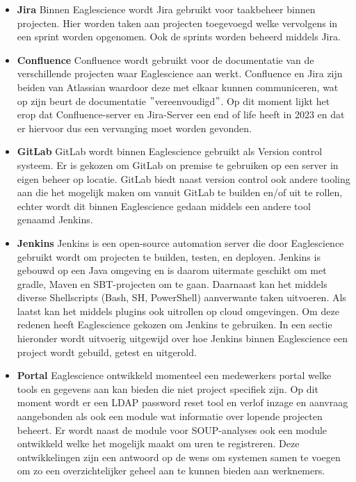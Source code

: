 \begin{itemize}
    \item \textbf{Jira}
    Binnen Eaglescience wordt Jira gebruikt voor taakbeheer binnen projecten. Hier worden taken aan projecten toegevoegd welke vervolgens in een sprint worden opgenomen. Ook de sprints worden beheerd middels Jira.
    \item \textbf{Confluence}
    Confluence wordt gebruikt voor de documentatie van de verschillende projecten waar Eaglescience aan werkt. Confluence en Jira zijn beiden van Atlassian waardoor deze met elkaar kunnen communiceren, wat op zijn beurt de documentatie $"$vereenvoudigd$"$. Op dit moment lijkt het erop dat Confluence-server en Jira-Server een end of life heeft in 2023 en dat er hiervoor dus een vervanging moet worden gevonden.
    \item \textbf{GitLab}
    GitLab wordt binnen Eaglescience gebruikt als Version control systeem. Er is gekozen om GitLab on premise te gebruiken op een server in eigen beheer op locatie. GitLab biedt naast version control ook andere tooling aan die het mogelijk maken om vanuit GitLab te builden en/of uit te rollen, echter wordt dit binnen Eaglescience gedaan middels een andere tool genaamd Jenkins.
    \item \textbf{Jenkins}
    Jenkins is een open-source automation server die door Eaglescience gebruikt wordt om projecten te builden, testen, en deployen. Jenkins is gebouwd op een Java omgeving en is daarom uitermate geschikt om met gradle, Maven en SBT-projecten om te gaan. Daarnaast kan het middels diverse Shellscripts (Bash, SH, PowerShell) aanverwante taken uitvoeren. Als laatst kan het middels plugins ook uitrollen op cloud omgevingen. Om deze redenen heeft Eaglescience gekozen om Jenkins te gebruiken. In een sectie hieronder wordt uitvoerig uitgewijd over hoe Jenkins binnen Eaglescience een project wordt gebuild, getest en uitgerold.
    \item \textbf{Portal}
    Eaglescience ontwikkeld momenteel een medewerkers portal welke tools en gegevens aan kan bieden die niet project specifiek zijn. Op dit moment wordt er een LDAP password reset tool en verlof inzage en aanvraag aangebonden als ook een module wat informatie over lopende projecten beheert. Er wordt naast de module voor SOUP-analyses ook een module ontwikkeld welke het mogelijk maakt om uren te registreren. Deze ontwikkelingen zijn een antwoord op de wens om systemen samen te voegen om zo een overzichtelijker geheel aan te kunnen bieden aan werknemers.
\end{itemize}


